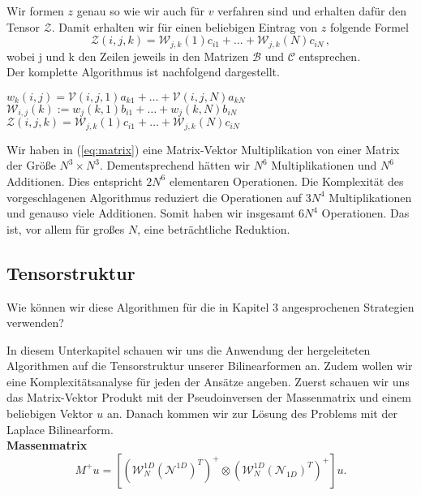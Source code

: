 Wir formen $z$ genau so wie wir auch für $v$ verfahren sind und erhalten dafür den Tensor $\mathcal{Z}$. Damit erhalten wir für einen beliebigen Eintrag von $z$ folgende Formel
\begin{equation*}
\mathcal{Z}(i,j,k) = \mathcal{W}_{j,k}(1) c_{i1}  + \dots +  \mathcal{W}_{j,k}(N) c_{iN} \, ,
\end{equation*}
wobei j und k den Zeilen jeweils in den Matrizen $\mathcal{B}$ und $\mathcal{C}$ entsprechen. \\
Der komplette Algorithmus ist nachfolgend dargestellt.
\newpage
\begin{mdframed}[backgroundcolor=blue!3] 
\begin{algorithmic}
			\State $w_{k}(i,j) = \mathcal{V}(i,j,1)a_{k1} + \dots + \mathcal{V}(i,j,N)a_{kN}$
		\EndFor
	\EndFor
\EndFor
{}
			\State $\mathcal{W}_{i,j} (k):= w_j(k,1) b_{i1} + \dots + w_j(k,N) b_{iN}$
		\EndFor
	\EndFor
\EndFor
{}
			\State $\mathcal{Z}(i,j,k) = \mathcal{W}_{j,k}(1) c_{i1}  + \dots +  \mathcal{W}_{j,k}(N) c_{iN}$ 
		\EndFor
	\EndFor
\EndFor
\end{algorithmic}
\end{mdframed}

 
Wir haben in (\ref{eq:matrix}) eine Matrix-Vektor Multiplikation von einer Matrix der Größe $N^3 \times N^3$. Dementsprechend hätten wir $N^{6}$ Multiplikationen und $N^6$ Additionen. Dies entspricht $2N^6$ elementaren Operationen. Die Komplexität des vorgeschlagenen Algorithmus reduziert die Operationen auf $3N^{4}$ Multiplikationen und genauso viele Additionen. Somit haben wir insgesamt $6N^4$ Operationen. Das ist, vor allem für großes $N$, eine beträchtliche Reduktion.
\newline

\newpage
\subsection{Tensorstruktur}

Wie können wir diese Algorithmen für die in Kapitel 3 angesprochenen Strategien verwenden?

In diesem Unterkapitel schauen wir uns die Anwendung der hergeleiteten Algorithmen auf die Tensorstruktur unserer Bilinearformen an. Zudem wollen wir eine Komplexitätsanalyse für jeden der Ansätze angeben. Zuerst schauen wir uns das Matrix-Vektor Produkt mit der Pseudoinversen der Massenmatrix und einem beliebigen Vektor $u$ an. Danach kommen wir zur Lösung des Problems mit der Laplace Bilinearform. \\
\textbf{Massenmatrix} 
\begin{equation*}
M^{+}u =  [(\mathcal{W}_N^{1D} (\mathcal{N}^{1D})^T)^+ \otimes (\mathcal{W}_N^{1D} (\mathcal{N}_{1D})^T)^+]u.
\end{equation*}



